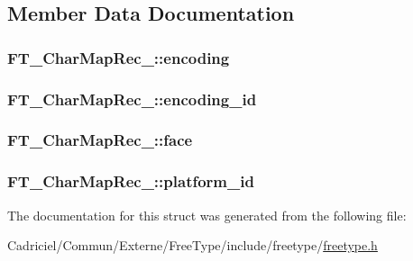 \subsection{Member Data Documentation}
\hypertarget{struct_f_t___char_map_rec___a88ee6f726ef11a8e6cc793d59ff5557e}{
\subsubsection[{encoding}]{ F\-T\-\_\-\-Char\-Map\-Rec\-\_\-\-::encoding}}\label{struct_f_t___char_map_rec___a88ee6f726ef11a8e6cc793d59ff5557e}
\hypertarget{struct_f_t___char_map_rec___af10dd43eee8dc93e7d6191c663ae831a}{
\subsubsection[{encoding\-\_\-id}]{ F\-T\-\_\-\-Char\-Map\-Rec\-\_\-\-::encoding\-\_\-id}}\label{struct_f_t___char_map_rec___af10dd43eee8dc93e7d6191c663ae831a}
\hypertarget{struct_f_t___char_map_rec___a70a4e53e3f9818209916e5745c46dc28}{
\subsubsection[{face}]{ F\-T\-\_\-\-Char\-Map\-Rec\-\_\-\-::face}}\label{struct_f_t___char_map_rec___a70a4e53e3f9818209916e5745c46dc28}
\hypertarget{struct_f_t___char_map_rec___ae7f439996a8615698e780ce3c4f92457}{
\subsubsection[{platform\-\_\-id}]{ F\-T\-\_\-\-Char\-Map\-Rec\-\_\-\-::platform\-\_\-id}}\label{struct_f_t___char_map_rec___ae7f439996a8615698e780ce3c4f92457}


The documentation for this struct was generated from the following file\-:\begin{DoxyCompactItemize}
\item 
Cadriciel/\-Commun/\-Externe/\-Free\-Type/include/freetype/\hyperlink{freetype_8h}{freetype.\-h}\end{DoxyCompactItemize}
